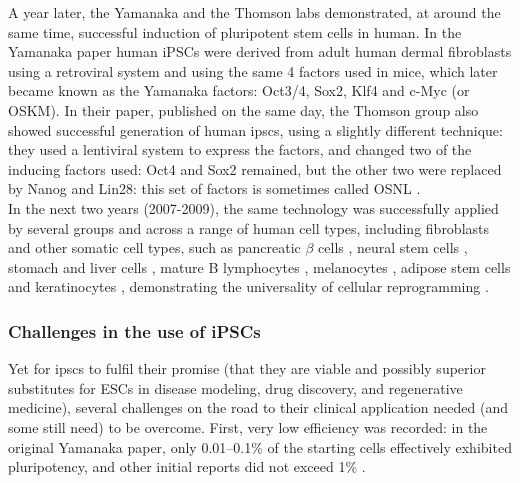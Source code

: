 A year later, the Yamanaka and the Thomson labs demonstrated, at around the same time, successful induction of pluripotent stem cells in human.
In the Yamanaka paper \cite{takahashi2007induction} human iPSCs were derived from adult human dermal fibroblasts using a retroviral system and using the same 4 factors used in mice, which later became known as the Yamanaka factors: Oct3/4, Sox2, Klf4 and c-Myc (or OSKM).
In their paper, published on the same day, the Thomson group also showed successful generation of human \glspl{ipsc}, using a slightly different technique: they used a lentiviral system to express the factors, and changed two of the inducing factors used: Oct4 and Sox2 remained, but the other two were replaced by Nanog and Lin28: this set of factors is sometimes called OSNL \cite{yu2007induced}.\\

In the next two years (2007-2009), the same technology was successfully applied by several groups and across a range of human cell types, including fibroblasts \cite{park2008reprogramming} and other somatic cell types, such as pancreatic $\beta$ cells \cite{stadtfeld2008reprogramming}, neural stem cells \cite{eminli2008reprogramming, kim2008pluripotent}, stomach and liver cells \cite{aoi2008generation}, mature B lymphocytes \cite{hanna2008direct}, melanocytes \cite{utikal2009sox2}, adipose stem cells \cite{sun2009feeder} and keratinocytes \cite{maherali2008high}, demonstrating the universality of cellular reprogramming \cite{omole2018ten}.

\subsubsection{Challenges in the use of iPSCs}
Yet for \glspl{ipsc} to fulfil their promise (that they are viable and possibly superior substitutes for ESCs in disease modeling, drug discovery, and regenerative medicine), several challenges on the road to their clinical application needed (and some still need) to be overcome.
First, very low efficiency was recorded: in the original Yamanaka paper, only 0.01–0.1\% \cite{takahashi2006induction} of the starting cells effectively exhibited pluripotency, and other initial reports did not exceed 1\% \cite{takahashi2007induction, okita2007generation, lowry2008generation}. \\

